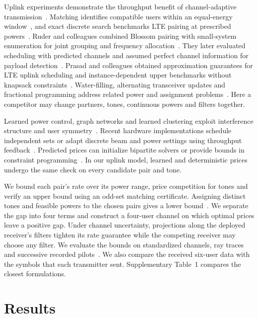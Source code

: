 \documentclass[lineno,pdflatex,sn-nature]{sn-jnl}
\begin{document}
Uplink experiments demonstrate the throughput benefit of channel-adaptive transmission~\cite{haustein}. Matching identifies compatible users within an equal-energy window~\cite{viterbo}, and exact discrete search benchmarks LTE pairing at prescribed powers~\cite{fan}. Ruder and colleagues combined Blossom pairing with small-system enumeration for joint grouping and frequency allocation~\cite{ruder2013}. They later evaluated scheduling with predicted channels and assumed perfect channel information for payload detection~\cite{ruder2014}. Prasad and colleagues obtained approximation guarantees for LTE uplink scheduling and instance-dependent upper benchmarks without knapsack constraints~\cite{prasad}. Water-filling, alternating transceiver updates and fractional programming address related power and assignment problems~\cite{viswanath,shi,shenfpone,shenfptwo}. Here a competitor may change partners, tones, continuous powers and filters together.

Learned power control, graph networks and learned clustering exploit interference structure and user symmetry~\cite{sun,shen,hejazicluster,ahmadi2026}. Recent hardware implementations schedule independent sets or adapt discrete beam and power settings using throughput feedback~\cite{hamakawa2026,kashimata2026}. Predicted prices can initialize bipartite solvers or provide bounds in constraint programming~\cite{dinitz,bessa}. In our uplink model, learned and deterministic prices undergo the same check on every candidate pair and tone.

We bound each pair's rate over its power range, price competition for tones and verify an upper bound using an odd-set matching certificate. Assigning distinct tones and feasible powers to the chosen pairs gives a lower bound~\cite{edmonds,kuhn}. We separate the gap into four terms and construct a four-user channel on which optimal prices leave a positive gap. Under channel uncertainty, projections along the deployed receiver's filters tighten its rate guarantee while the competing receiver may choose any filter. We evaluate the bounds on standardized channels, ray traces and successive recorded pilots~\cite{tr,sionna,deepmimo,zafari,renew}. We also compare the received six-user data with the symbols that each transmitter sent. Supplementary Table~1 compares the closest formulations.

\section*{Results}
\end{document}
